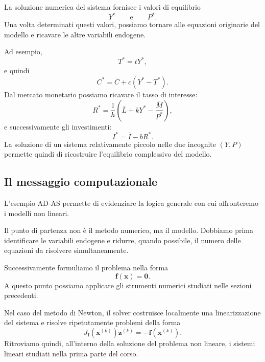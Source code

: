La soluzione numerica del sistema fornisce i valori di equilibrio
\begin{equation*}
    Y^*
    \qquad\text{e}\qquad
    P^*.
\end{equation*}
Una volta determinati questi valori, possiamo tornare alle equazioni
originarie del modello e ricavare le altre variabili endogene.

Ad esempio,
\begin{equation*}
    T^*=tY^*,
\end{equation*}
e quindi
\begin{equation*}
    C^*
    =
    \bar{C}
    +
    c(Y^*-T^*).
\end{equation*}
Dal mercato monetario possiamo ricavare il tasso di interesse:
\begin{equation*}
    R^*
    =
    \frac{1}{h}
    \left(
        \bar{L}
        +kY^*
        -\frac{\bar{M}}{P^*}
    \right),
\end{equation*}
e successivamente gli investimenti:
\begin{equation*}
    I^*
    =
    \bar{I}-bR^*.
\end{equation*}
La soluzione di un sistema relativamente piccolo nelle due
incognite $(Y,P)$ permette quindi di ricostruire l'equilibrio
complessivo del modello.

\subsection{Il messaggio computazionale}

L'esempio AD-AS permette di evidenziare la logica generale con cui
affronteremo i modelli non lineari.

Il punto di partenza non è il metodo numerico, ma il modello.
Dobbiamo prima identificare le variabili endogene e ridurre, quando
possibile, il numero delle equazioni da risolvere simultaneamente.

Successivamente formuliamo il problema nella forma
\begin{equation*}
    \mathbf{f}(\mathbf{x})=\mathbf{0}.
\end{equation*}
A questo punto possiamo applicare gli strumenti numerici studiati
nelle sezioni precedenti.

Nel caso del metodo di Newton, il solver costruisce localmente una
linearizzazione del sistema e risolve ripetutamente problemi della
forma
\begin{equation*}
    J_{\mathbf{f}}(\mathbf{x}^{(k)})
    \mathbf{z}^{(k)}
    =
    -\mathbf{f}(\mathbf{x}^{(k)}).
\end{equation*}
Ritroviamo quindi, all'interno della soluzione del problema non
lineare, i sistemi lineari studiati nella prima parte del corso.

